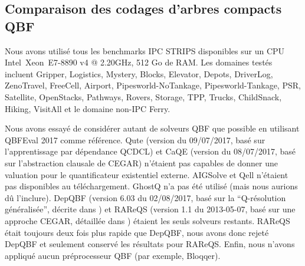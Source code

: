 \subsection{Comparaison des codages d'arbres compacts QBF}



Nous avons utilisé tous les benchmarks IPC STRIPS disponibles %
sur un CPU Intel\textregistered\ Xeon\textregistered\ E7-8890 v4 @ 2.20GHz, 512 Go de RAM. Les domaines testés incluent Gripper, Logistics, Mystery, Blocks, Elevator, Depots, DriverLog, ZenoTravel, FreeCell, Airport, Pipesworld-NoTankage, Pipesworld-Tankage, PSR, Satellite, OpenStacks, Pathways, Rovers, Storage, TPP, Trucks, ChildSnack, Hiking, VisitAll et le domaine non-IPC Ferry.

Nous avons essayé de considérer autant de solveurs QBF que possible en utilisant QBFEval 2017 comme référence. Qute (version du 09/07/2017, basé sur l'apprentissage par dépendance QCDCL) et CaQE (version du 08/07/2017, basé sur l'abstraction clausale de CEGAR) n'étaient pas capables de donner une valuation pour le quantificateur existentiel externe. AIGSolve et Qell n'étaient pas disponibles au téléchargement. GhostQ n'a pas été utilisé (mais nous aurions dû l'inclure). DepQBF (version 6.03 du 02/08/2017, basé sur la \enquote{Q-résolution généralisée}, décrite dans \cite{DBLP:conf/cade/LonsingE17}) et RAReQS (version 1.1 du 2013-05-07, basé sur une approche CEGAR, détaillée dans \cite{DBLP:conf/sat/JanotaKMC12}) étaient les seuls solveurs restants. RAReQS était toujours deux fois plus rapide que DepQBF, nous avons donc rejeté DepQBF et seulement conservé les résultats pour RAReQS. Enfin, nous n'avons appliqué aucun préprocesseur QBF (par exemple, Bloqqer).


